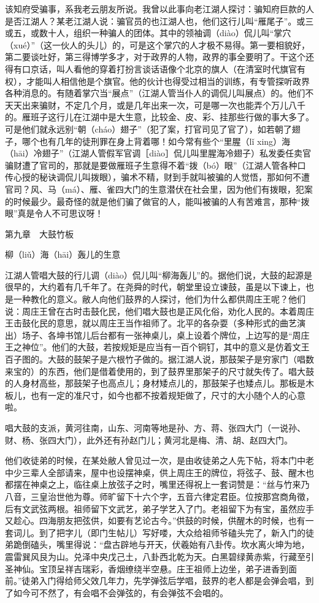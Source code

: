 \documentclass[12pt,UTF8]{ctexbook}
\begin{document}
该知府受骗事，系我老云朋友所说。我曾以此事向老江湖人探讨：骗知府巨款的人是否江湖人？某老江湖人说：骗官员的也江湖人也，他们这行儿叫“雁尾子”。或三或五，或数十人，组织一种骗人的团体。其中的领袖调（diào）侃儿叫“掌穴（xué）”（这一伙人的头儿）的，可是这个掌穴的人才极不易得。第一要相貌好，第二要谈吐好，第三得博学多才，对于政界的人物，政界的事全要明了。干这个还得有口京话，叫人看他的穿着打扮言谈话语像个北京的旗人（在清室时代旗官有权），才能叫人相信他是个旗官。他的伙计也得受过相当的训练，有专管探听政界各种消息的。有随着掌穴当“展点”（江湖人管当仆人的调侃儿叫展点）的。他们不天天出来骗财，不定几个月，或是几年出来一次，可是哪一次也能弄个万儿八千的。雁班子这行儿在江湖中是大生意，比较金、皮、彩、挂那些行做的事大多了。可是他们就永远别“朝（cháo）翅子”（犯了案，打官司见了官了），如若朝了翅子，哪个也有几年的徒刑罪在身上背着哪！如今常有些个“里腥（lǐ xing）海（hāi）冷翅子”（江湖人管假军官调［diào］侃儿叫里腥海冷翅子）私发委任卖官骗财遭了官司的，那就是要做雁班子生意得不着“拨（bó）眼”（江湖人管各种口传心授的秘诀调侃儿叫拨眼），骗术不精，财到手就叫被骗的人觉悟，那如何不遭官司？风、马（má）、雁、雀四大门的生意潜伏在社会里，因为他们有拨眼，犯案的时候最少。最奇怪的就是他们骗了做官的人，能叫被骗的人有苦难言，那种“拨眼”真是令人不可思议呀！





第九章　大鼓竹板


柳（liǔ）海（hāi）轰儿的生意


江湖人管唱大鼓的行儿调（diào）侃儿叫“柳海轰儿”的。据他们说，大鼓的起源是很早的，大约着有几千年了。在尧舜的时代，朝堂里设立谏鼓，虽是以下谏上，也是一种教化的意义。敝人向他们鼓界的人探讨，他们为什么都供周庄王呢？他们说：周庄王曾在古时击鼓化民，他们唱大鼓也是正风化俗，劝化人民的。本着周庄王击鼓化民的意思，就以周庄王当作祖师了。北平的各杂耍（多种形式的曲艺演出）场子、各坤书馆儿后台都有一张神桌儿，桌上设着个牌位，上边写的是“周庄王之神位”。他们的大鼓，若按规矩是应当有一百个铜钉，其中的意义是仿着文王百子图的。大鼓的鼓架子是六根竹子做的。据江湖人说，那鼓架子是穷家门（唱数来宝的）的东西，他们是借着使用的，到了鼓界里那架子的尺寸就失传了。唱大鼓的人身材高些，那鼓架子也高点儿；身材矮点儿的，那鼓架子也矮点儿。那板是木板儿，也有一定的准尺寸，如今也都不按着规矩做了，尺寸的大小随个人的心意啦。

唱大鼓的支派，黄河往南，山东、河南等地是孙、方、蒋、张四大门（一说孙、财、杨、张四大门），此外还有孙赵门儿；黄河北是梅、清、胡、赵四大门。

他们收徒弟的时候，在某处敝人曾见过一次，是由收徒弟之人先下帖，将本门中老中少三辈人全部请来，屋中也设摆神桌，供上周庄王的牌位，将弦子、鼓、醒木也都摆在神桌之上，临往桌上放弦子之时，嘴里还得祝上一套词赞是：“丝与竹来乃八音，三皇治世他为尊。师旷留下十六个字，五音六律定君臣。位按那宫商角徵，后有文武弦两根。祖师留下文武艺，弟子学艺入了门。老祖留下为有宝，虽然应手又趁心。四海朋友把弦供，如要有艺论古今。”供鼓的时候，供醒木的时候，也有一套词儿。到了把字儿（即门生帖儿）写好喽，大众给祖师爷磕头完了，新入门的徒弟跪倒磕头，嘴里得说：“盘古辟地与开天，伏羲始有八卦传。坎水离火坤为地，震雷巽风艮为山。兑泽中央戊己土，八卦西北乾为天。白黑碧绿黄赤紫，行藏至引圣神仙。宝顶呈祥吉瑞彩，香烟缭绕半空悬。庄王祖师上边坐，弟子进香到面前。”徒弟入门得给师父效几年力，先学弹弦后学唱，鼓界的老人都是会弹会唱，到了如今可不然了，有会唱不会弹弦的，有会弹弦不会唱的。
\end{document}
